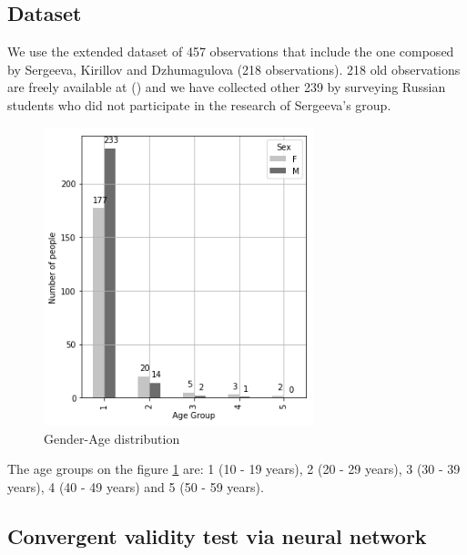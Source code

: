 \documentclass{llncs}
\begin{document}
\subsection{Dataset}
We use the extended dataset of 457 observations that include the one composed by Sergeeva, Kirillov and Dzhumagulova (218 observations). 218 old observations are freely available at (\cite{TIPIDATA}) and we have collected other 239 by surveying Russian students who did not participate in the research of Sergeeva's group.
\begin{figure}[!h]
	\centering
	\includegraphics[width=0.7\textwidth]{figures/genderage.png}
	\caption{Gender-Age distribution}
	\label{fig:fig0}
\end{figure}
The age groups on the figure \ref{fig:fig0} are: 1 (10 - 19 years), 2 (20 - 29 years), 3 (30 - 39 years), 4 (40 - 49 years) and 5 (50 - 59 years).

\subsection{Convergent validity test via neural network}
\end{document}
